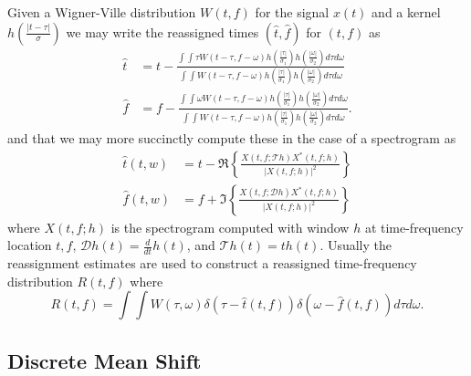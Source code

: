 \documentclass[english]{article}
\begin{document}
Given a Wigner-Ville distribution $W(t,f)$ for the signal $x(t)$ and a kernel $h\left(\frac{|t-\tau|}{\sigma}\right)$ we 
may write the reassigned times $(\hat{t},\hat{f})$ for $(t,f)$ as \cite{auger03}
\begin{align}
\hat{t} &=  t -\frac{\int\int \tau W(t-\tau,f-\omega) h\left(\frac{|\tau|}{\sigma_1}\right)h\left(\frac{|\omega|}{\sigma_2}\right)d\tau d\omega}{
 \int\int W(t-\tau,f-\omega) h\left(\frac{|\tau|}{\sigma_1}\right)h\left(\frac{|\omega|}{\sigma_2}\right)d\tau d\omega}\\
\hat{f} &=  f -\frac{\int\int \omega W(t-\tau,f-\omega) h\left(\frac{|\tau|}{\sigma_1}\right)h\left(\frac{|\omega|}{\sigma_2}\right)d\tau d\omega}{
 \int\int W(t-\tau,f-\omega) h\left(\frac{|\tau|}{\sigma_1}\right)h\left(\frac{|\omega|}{\sigma_2}\right)d\tau d\omega}.
\end{align}
and that we may more succinctly compute these in the case of a spectrogram as
\begin{align}
\hat{t}(t,w) &= t - \Re\left\{\frac{X(t,f; \mathcal{T}h) X^*(t,f; h)}{|X(t,f; h)|^2 }\right\}\\
\hat{f}(t,w) &= f + \Im\left\{\frac{X(t,f; \mathcal{D}h) X^*(t,f; h)}{|X(t,f; h)|^2 }\right\}
\end{align}
where $X(t,f; h)$ is the spectrogram computed with window $h$ at time-frequency location $t,f$, $\mathcal{D}h(t)=\frac{d}{dt}h(t)$, and $\mathcal{T}h(t)=th(t)$.
Usually the reassignment estimates are used to construct a reassigned time-frequency distribution $R(t,f)$ where
\begin{equation}
R(t,f) = \int\int W(\tau,\omega) \delta(\tau-\hat{t}(t,f))\delta(\omega -\hat{f}(t,f))d\tau d\omega.
\end{equation}

\subsection{Discrete Mean Shift}
\end{document}
